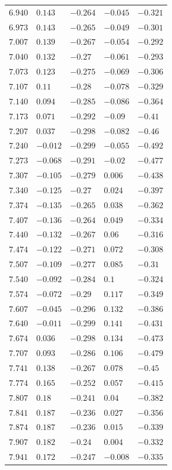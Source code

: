 \begin{center}
\begin{longtable}{lllll}
$6.940$&$0.143$&$-0.264$&$-0.045$&$-0.321$\\
$6.973$&$0.143$&$-0.265$&$-0.049$&$-0.301$\\
$7.007$&$0.139$&$-0.267$&$-0.054$&$-0.292$\\
$7.040$&$0.132$&$-0.27$&$-0.061$&$-0.293$\\
$7.073$&$0.123$&$-0.275$&$-0.069$&$-0.306$\\
$7.107$&$0.11$&$-0.28$&$-0.078$&$-0.329$\\
$7.140$&$0.094$&$-0.285$&$-0.086$&$-0.364$\\
$7.173$&$0.071$&$-0.292$&$-0.09$&$-0.41$\\
$7.207$&$0.037$&$-0.298$&$-0.082$&$-0.46$\\
$7.240$&$-0.012$&$-0.299$&$-0.055$&$-0.492$\\
$7.273$&$-0.068$&$-0.291$&$-0.02$&$-0.477$\\
$7.307$&$-0.105$&$-0.279$&$0.006$&$-0.438$\\
$7.340$&$-0.125$&$-0.27$&$0.024$&$-0.397$\\
$7.374$&$-0.135$&$-0.265$&$0.038$&$-0.362$\\
$7.407$&$-0.136$&$-0.264$&$0.049$&$-0.334$\\
$7.440$&$-0.132$&$-0.267$&$0.06$&$-0.316$\\
$7.474$&$-0.122$&$-0.271$&$0.072$&$-0.308$\\
$7.507$&$-0.109$&$-0.277$&$0.085$&$-0.31$\\
$7.540$&$-0.092$&$-0.284$&$0.1$&$-0.324$\\
$7.574$&$-0.072$&$-0.29$&$0.117$&$-0.349$\\
$7.607$&$-0.045$&$-0.296$&$0.132$&$-0.386$\\
$7.640$&$-0.011$&$-0.299$&$0.141$&$-0.431$\\
$7.674$&$0.036$&$-0.298$&$0.134$&$-0.473$\\
$7.707$&$0.093$&$-0.286$&$0.106$&$-0.479$\\
$7.741$&$0.138$&$-0.267$&$0.078$&$-0.45$\\
$7.774$&$0.165$&$-0.252$&$0.057$&$-0.415$\\
$7.807$&$0.18$&$-0.241$&$0.04$&$-0.382$\\
$7.841$&$0.187$&$-0.236$&$0.027$&$-0.356$\\
$7.874$&$0.187$&$-0.236$&$0.015$&$-0.339$\\
$7.907$&$0.182$&$-0.24$&$0.004$&$-0.332$\\
$7.941$&$0.172$&$-0.247$&$-0.008$&$-0.335$\\

\end{longtable}
\end{center}
